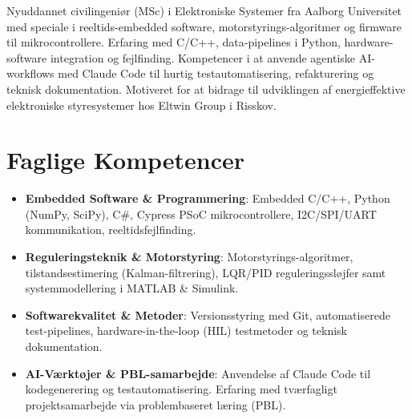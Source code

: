 \documentclass[11pt,a4paper,sans]{moderncv}
\begin{document}
\makecvtitle


\vspace{6pt}
\small{Nyuddannet civilingeniør (MSc) i Elektroniske Systemer fra Aalborg Universitet med speciale i reeltids-embedded software, motorstyrings-algoritmer og firmware til mikrocontrollere. Erfaring med C/C++, data-pipelines i Python, hardware-software integration og fejlfinding. Kompetencer i at anvende agentiske AI-workflows med Claude Code til hurtig testautomatisering, refakturering og teknisk dokumentation. Motiveret for at bidrage til udviklingen af energieffektive elektroniske styresystemer hos Eltwin Group i Risskov.}


\section{Faglige Kompetencer}
\vspace{1pt}
\begin{itemize}

\item \textbf{Embedded Software \& Programmering}: Embedded C/C++, Python (NumPy, SciPy), C\#, Cypress PSoC mikrocontrollere, I2C/SPI/UART kommunikation, reeltidsfejlfinding.

\item \textbf{Reguleringsteknik \& Motorstyring}: Motorstyrings-algoritmer, tilstandsestimering (Kalman-filtrering), LQR/PID reguleringssløjfer samt systemmodellering i MATLAB \& Simulink.

\item \textbf{Softwarekvalitet \& Metoder}: Versionsstyring med Git, automatiserede test-pipelines, hardware-in-the-loop (HIL) testmetoder og teknisk dokumentation.

\item \textbf{AI-Værktøjer \& PBL-samarbejde}: Anvendelse af Claude Code til kodegenerering og testautomatisering. Erfaring med tværfagligt projektsamarbejde via problembaseret læring (PBL).

\end{itemize}

\end{document}

